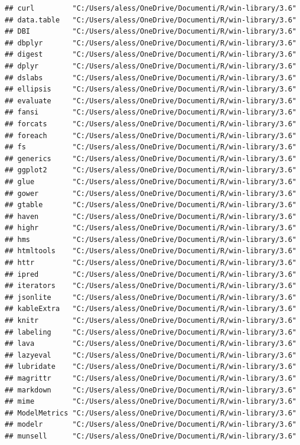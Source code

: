 \documentclass[]{article}
\begin{document}
\begin{verbatim}
## curl         "C:/Users/aless/OneDrive/Documenti/R/win-library/3.6"
## data.table   "C:/Users/aless/OneDrive/Documenti/R/win-library/3.6"
## DBI          "C:/Users/aless/OneDrive/Documenti/R/win-library/3.6"
## dbplyr       "C:/Users/aless/OneDrive/Documenti/R/win-library/3.6"
## digest       "C:/Users/aless/OneDrive/Documenti/R/win-library/3.6"
## dplyr        "C:/Users/aless/OneDrive/Documenti/R/win-library/3.6"
## dslabs       "C:/Users/aless/OneDrive/Documenti/R/win-library/3.6"
## ellipsis     "C:/Users/aless/OneDrive/Documenti/R/win-library/3.6"
## evaluate     "C:/Users/aless/OneDrive/Documenti/R/win-library/3.6"
## fansi        "C:/Users/aless/OneDrive/Documenti/R/win-library/3.6"
## forcats      "C:/Users/aless/OneDrive/Documenti/R/win-library/3.6"
## foreach      "C:/Users/aless/OneDrive/Documenti/R/win-library/3.6"
## fs           "C:/Users/aless/OneDrive/Documenti/R/win-library/3.6"
## generics     "C:/Users/aless/OneDrive/Documenti/R/win-library/3.6"
## ggplot2      "C:/Users/aless/OneDrive/Documenti/R/win-library/3.6"
## glue         "C:/Users/aless/OneDrive/Documenti/R/win-library/3.6"
## gower        "C:/Users/aless/OneDrive/Documenti/R/win-library/3.6"
## gtable       "C:/Users/aless/OneDrive/Documenti/R/win-library/3.6"
## haven        "C:/Users/aless/OneDrive/Documenti/R/win-library/3.6"
## highr        "C:/Users/aless/OneDrive/Documenti/R/win-library/3.6"
## hms          "C:/Users/aless/OneDrive/Documenti/R/win-library/3.6"
## htmltools    "C:/Users/aless/OneDrive/Documenti/R/win-library/3.6"
## httr         "C:/Users/aless/OneDrive/Documenti/R/win-library/3.6"
## ipred        "C:/Users/aless/OneDrive/Documenti/R/win-library/3.6"
## iterators    "C:/Users/aless/OneDrive/Documenti/R/win-library/3.6"
## jsonlite     "C:/Users/aless/OneDrive/Documenti/R/win-library/3.6"
## kableExtra   "C:/Users/aless/OneDrive/Documenti/R/win-library/3.6"
## knitr        "C:/Users/aless/OneDrive/Documenti/R/win-library/3.6"
## labeling     "C:/Users/aless/OneDrive/Documenti/R/win-library/3.6"
## lava         "C:/Users/aless/OneDrive/Documenti/R/win-library/3.6"
## lazyeval     "C:/Users/aless/OneDrive/Documenti/R/win-library/3.6"
## lubridate    "C:/Users/aless/OneDrive/Documenti/R/win-library/3.6"
## magrittr     "C:/Users/aless/OneDrive/Documenti/R/win-library/3.6"
## markdown     "C:/Users/aless/OneDrive/Documenti/R/win-library/3.6"
## mime         "C:/Users/aless/OneDrive/Documenti/R/win-library/3.6"
## ModelMetrics "C:/Users/aless/OneDrive/Documenti/R/win-library/3.6"
## modelr       "C:/Users/aless/OneDrive/Documenti/R/win-library/3.6"
## munsell      "C:/Users/aless/OneDrive/Documenti/R/win-library/3.6"

\end{verbatim}
\end{document}
